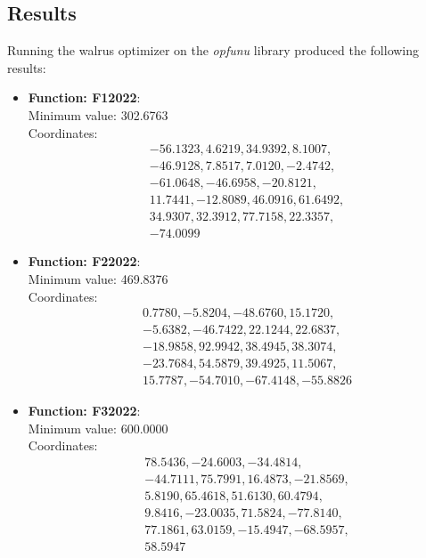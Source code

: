 \documentclass{article}
\begin{document}
\subsection{Results}

Running the walrus optimizer on the \textit{opfunu} library
produced the following results:

\begin{itemize}
  \item \textbf{Function: F12022}: \\
    Minimum value: 302.6763 \\
    Coordinates:
    \[
      \begin{aligned}
        & -56.1323, 4.6219, 34.9392, 8.1007, \\
        & -46.9128, 7.8517, 7.0120, -2.4742, \\
        & -61.0648, -46.6958, -20.8121, \\
        & 11.7441, -12.8089, 46.0916, 61.6492, \\
        & 34.9307, 32.3912, 77.7158, 22.3357, \\
        & -74.0099
      \end{aligned}
    \]

  \item \textbf{Function: F22022}: \\
    Minimum value: 469.8376 \\
    Coordinates:
    \[
      \begin{aligned}
        & 0.7780, -5.8204, -48.6760, 15.1720, \\
        & -5.6382, -46.7422, 22.1244, 22.6837, \\
        & -18.9858, 92.9942, 38.4945, 38.3074, \\
        & -23.7684, 54.5879, 39.4925, 11.5067, \\
        & 15.7787, -54.7010, -67.4148, -55.8826
      \end{aligned}
    \]

  \item \textbf{Function: F32022}: \\
    Minimum value: 600.0000 \\
    Coordinates:
    \[
      \begin{aligned}
        & 78.5436, -24.6003, -34.4814, \\
        & -44.7111, 75.7991, 16.4873, -21.8569, \\
        & 5.8190, 65.4618, 51.6130, 60.4794, \\
        & 9.8416, -23.0035, 71.5824, -77.8140, \\
        & 77.1861, 63.0159, -15.4947, -68.5957, \\
        & 58.5947
      \end{aligned}
    \]


\end{itemize}
\end{document}

